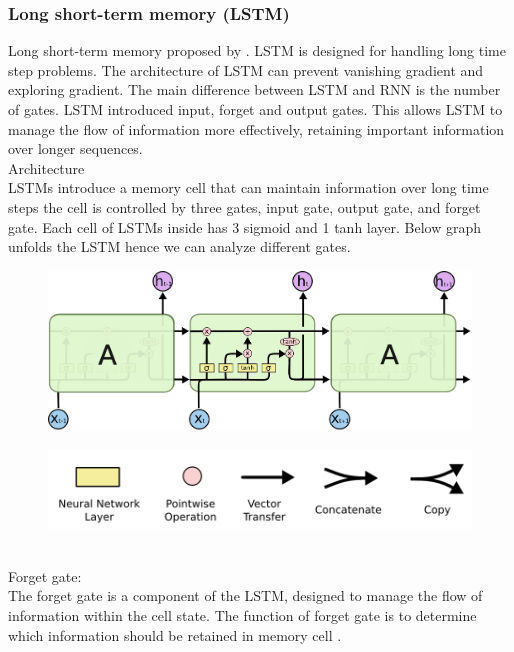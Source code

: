 \documentclass[12pt,a4paper]{article}
\begin{document}
\newpage
\subsubsection{Long short-term memory (LSTM)}
Long short-term memory proposed by \parencite{hochreiter1997lstm}. LSTM is designed for handling long time step problems. The architecture of LSTM can prevent vanishing gradient and exploring gradient. The main difference between LSTM and RNN is the number of gates. LSTM introduced input, forget and output gates. This allows LSTM to manage the flow of information more effectively, retaining important information over longer sequences.
\\[2ex]
Architecture
\\[1ex]
LSTMs introduce a memory cell that can maintain information over long time steps the cell is controlled by three gates, input gate, output gate, and forget gate. Each cell of LSTMs inside has 3 sigmoid and 1 tanh layer. Below graph unfolds the LSTM hence we can analyze different gates.
\begin{figure}[!htb]
    \centering
    \includegraphics[width=1\textwidth]{../Pic/lstm1.png} %
\end{figure}
\begin{figure}[!htb]
    \centering
    \includegraphics[width=1\textwidth]{../Pic/lstm2.png} %
\end{figure}
\\
Forget gate:
\\[1ex]
The forget gate is a component of the LSTM, designed to manage the flow of information within the cell state. The function of forget gate is to determine which information should be retained in memory cell \parencite{hochreiter1997lstm}.
\end{document}
